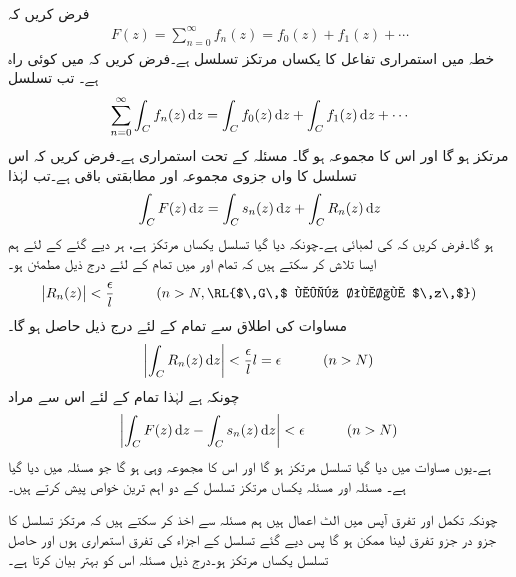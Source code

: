 \quad {}\\
فرض کریں کہ
\begin{align*}
F(z)=\sum\limits_{n=0}^{\infty} f_n(z)=f_0(z)+f_1(z)+\cdots
\end{align*}
خطہ  میں استمراری تفاعل کا یکساں مرتکز تسلسل ہے۔فرض کریں کہ  میں  کوئی راہ ہے۔ تب تسلسل
\begin{align}\label{مساوات_ٹیلر_جزو_در_جزو_قابل_تکمل_تسلسل}
\sum\limits_{n=0}^{\infty} \int_C f_n(z)\dif z=\int_C f_0(z)\dif z+\int_Cf_1(z)\dif z+\cdots
\end{align}
مرتکز ہو گا اور اس کا مجموعہ  ہو گا۔
\quad
مسئلہ  کے تحت  استمراری ہے۔فرض کریں کہ اس تسلسل کا  واں جزوی مجموعہ  اور مطابقتی باقی  ہے۔تب  لہٰذا
\begin{align*}
\int_CF(z)\dif z=\int_C s_n(z)\dif z+\int_C R_n(z)\dif z
\end{align*}
ہو گا۔فرض کریں کہ  کی لمبائی  ہے۔چونکہ دیا گیا تسلسل یکساں مرتکز ہے، ہر دیے گئے  کے لئے ہم ایسا  تلاش کر سکتے ہیں کہ تمام  اور  میں تمام  کے لئے درج ذیل مطمئن ہو۔
\begin{align*}
\abs{R_n(z)}<\frac{\epsilon}{l}\quad \quad \quad (n>N, \text{\RL{$\,G\,$ میں تمام $\,z\,$}})
\end{align*} 
مساوات  کی اطلاق سے تمام  کے لئے درج ذیل حاصل ہو گا۔
\begin{align*}
\abs{\int_C R_n(z)\dif z}<\frac{\epsilon}{l}l=\epsilon \quad \quad \quad (n>N)
\end{align*}
چونکہ  ہے لہٰذا تمام  کے لئے اس سے مراد 
\begin{align*}
\abs{\int_C F(z)\dif z-\int_C s_n(z)\dif z}<\epsilon\quad \quad \quad (n>N)
\end{align*}
ہے۔یوں مساوات  میں دیا گیا تسلسل مرتکز ہو گا اور اس کا مجموعہ وہی ہو گا جو مسئلہ میں دیا گیا ہے۔
 مسئلہ  اور مسئلہ  یکساں مرتکز تسلسل کے دو اہم ترین خواص پیش کرتے ہیں۔

چونکہ تکمل اور تفرق آپس میں الٹ اعمال ہیں ہم مسئلہ  سے اخذ کر سکتے ہیں کہ مرتکز تسلسل کا جزو در جزو تفرق لینا ممکن ہو گا پس دیے گئے تسلسل کے اجزاء کی تفرق استمراری ہوں اور حاصل تسلسل یکساں مرتکز ہو۔درج ذیل مسئلہ اس کو بہتر بیان کرتا ہے۔

